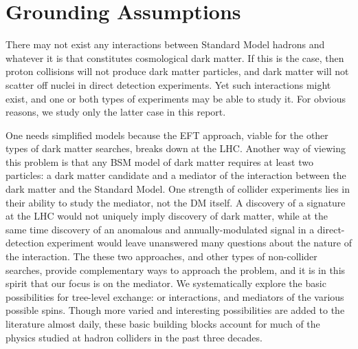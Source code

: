 \section{Grounding Assumptions}

There may not exist any interactions between Standard Model hadrons
and whatever it is that constitutes cosmological dark matter. If this
is the case, then proton collisions will not produce dark matter
particles, and dark matter will not scatter off nuclei in direct
detection experiments. Yet such interactions might exist, and one or
both types of experiments may be able to study it. For obvious
reasons, we study only the latter case in this report.

One needs simplified models because the EFT approach, viable for the
other types of dark matter searches, breaks down at the LHC. Another
way of viewing this problem is that any BSM model of dark matter
requires at least two particles: a dark matter candidate and a
mediator of the interaction between the dark matter and the Standard
Model. One strength of collider experiments lies in their ability to
study the mediator, not the DM itself. A discovery of a \MET signature
at the LHC would not uniquely imply discovery of dark matter, while at
the same time discovery of an anomalous and annually-modulated signal
in a direct-detection experiment would leave unanswered many questions
about the nature of the interaction. The these two approaches, and
other types of non-collider searches, provide complementary ways to
approach the problem, and it is in this spirit that our focus is on
the mediator. We systematically explore the basic possibilities for
tree-level exchange: \schannel or \tchannel interactions, and
mediators of the various possible spins. Though more varied and
interesting possibilities are added to the literature almost daily,
these basic building blocks account for much of the physics studied at
hadron colliders in the past three decades.

